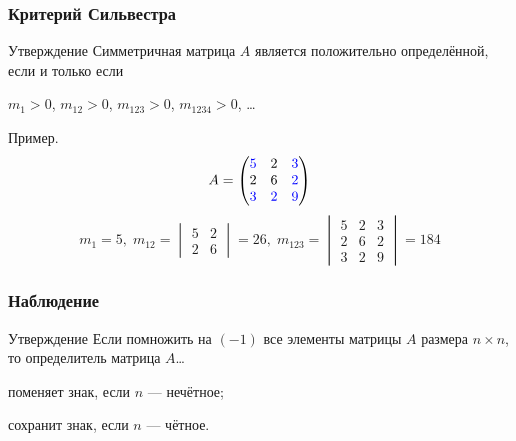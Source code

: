 \begin{frame}
    \frametitle{Критерий Сильвестра}

    \begin{block}{Утверждение}
        Симметричная матрица $A$ является положительно определённой, если и только если

        $m_1 > 0$, $m_{12} > 0$, $m_{123} > 0$, $m_{1234}>0$, \ldots   \pause     
    \end{block}

    Пример. 
\[
A = \begin{pmatrix}
    \textcolor{blue}{5} & 2 & \textcolor{blue}{3}  \\
    2 & 6 & \textcolor{blue}{2} \\
    \textcolor{blue}{3} & \textcolor{blue}{2} & \textcolor{blue}{9} \\
\end{pmatrix}
\]
\[
    m_1 = 5, \; m_{12} = \begin{vmatrix}
        5 & 2 \\
        2 & 6
    \end{vmatrix} = 26, \; 
    m_{123} = \begin{vmatrix}
        5 & 2 & 3 \\
        2 & 6 & 2 \\
        3 & 2 & 9
    \end{vmatrix}=  184
\]
    
\end{frame}


\begin{frame}
    \frametitle{Наблюдение}

    \begin{block}{Утверждение}
    Если помножить на $(-1)$ все элементы матрицы $A$ размера $n\times n$, то определитель матрица $A$\ldots \pause

    поменяет знак, если $n$ — нечётное; \pause

    сохранит знак, если $n$ — чётное. 
    \end{block}

    


\end{frame}

    

